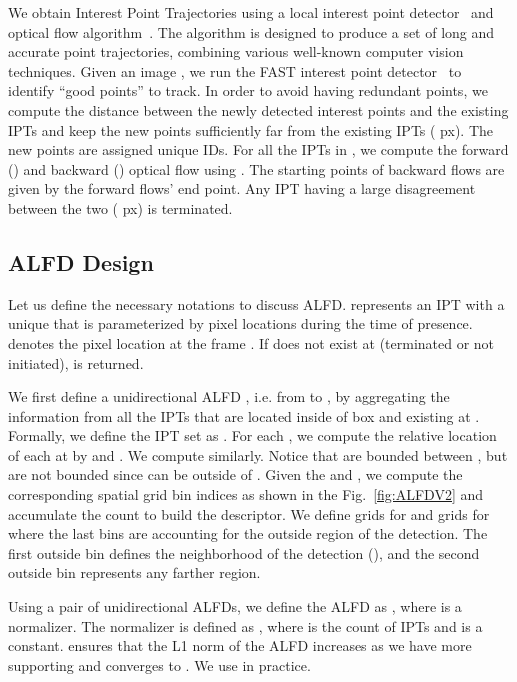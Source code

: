 \documentclass[10pt,twocolumn,letterpaper]{article}
\begin{document}
We obtain Interest Point Trajectories using a local interest point detector~\cite{bradski2008learning,rosten2006machine} and optical flow algorithm~\cite{bradski2008learning,farneback2001very}. The algorithm is designed to produce a set of long and accurate point trajectories, combining various well-known computer vision techniques. Given an image , we run the FAST interest point detector~\cite{bradski2008learning,rosten2006machine} to identify ``good points'' to track. In order to avoid having redundant points, we compute the distance between the newly detected interest points and the existing IPTs and keep the new points sufficiently far from the existing IPTs ( px). The new points are assigned unique IDs. For all the IPTs in , we compute the forward () and backward () optical flow using \cite{bradski2008learning,farneback2001very}. The starting points of backward flows are given by the forward flows' end point. Any IPT having a  large disagreement between the two ( px) is terminated. 

\subsection{ALFD Design}

Let us define the necessary notations to discuss ALFD.  represents an IPT with a unique  that is parameterized by pixel locations  during the time of presence.  denotes the pixel location at the frame . If  does not exist at  (terminated or not initiated),  is returned.

We first define a unidirectional ALFD , i.e. from  to , by aggregating the information from all the IPTs that are located inside of  box and existing at . Formally, we define the IPT set as . For each , we compute the relative location  of each  at  by  and . We compute  similarly. Notice that  are bounded between , but  are not bounded since  can be outside of . Given the  and , we compute the corresponding spatial grid bin indices as shown in the Fig.~\ref{fig:ALFDV2} and accumulate the count to build the descriptor. We define  grids for  and  grids for  where the last  bins are accounting for the outside region of the detection. The first outside bin defines the neighborhood of the detection (), and the second outside bin represents any farther region. 

Using a pair of unidirectional ALFDs, we define the ALFD as , where  is a normalizer. The normalizer  is defined as , where  is the count of IPTs and  is a constant.  ensures that the L1 norm of the ALFD increases as we have more supporting  and converges to . We use  in practice.
\end{document}
